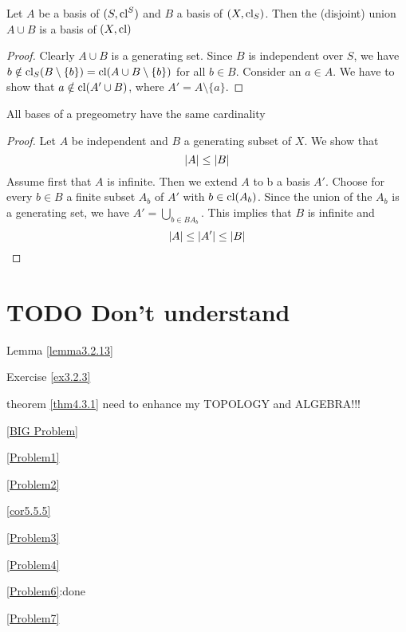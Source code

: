 \documentclass[11pt]{article}
\begin{document}
\begin{remark}
Let \(A\) be a basis of \((S,\operatorname{\text{cl}}^S)\) and \(B\) a basis of \((X,\operatorname{\text{cl}}_S)\). Then the (disjoint)
union \(A\cup B\) is a basis of \((X,\operatorname{\text{cl}})\)
\end{remark}

\begin{proof}
Clearly \(A\cup B\) is a generating set. Since \(B\) is independent over \(S\), we
have \(b\notin\operatorname{\text{cl}}_S(B\setminus\{b\})=\operatorname{\text{cl}}(A\cup B\setminus\{b\})\) for all \(b\in B\). Consider an \(a\in A\). We have to show
that \(a\notin\operatorname{\text{cl}}(A'\cup B)\), where \(A'=A\setminus\{a\}\).
\end{proof}

\begin{lemma}[]
All bases of a pregeometry have the same cardinality
\end{lemma}

\begin{proof}
Let \(A\) be independent and \(B\) a generating subset of \(X\). We show that
\begin{equation*}
\abs{A}\le\abs{B}
\end{equation*}
Assume first that \(A\) is infinite. Then we extend \(A\) to b a basis \(A'\). Choose for
every \(b\in B\) a finite subset \(A_b\) of \(A'\) with \(b\in\operatorname{\text{cl}}(A_b)\). Since the union of
the \(A_b\) is a generating set, we have \(A'=\bigcup_{b\in BA_b}\). This implies that \(B\) is infinite
and
\begin{equation*}
\abs{A}\le\abs{A'}\le\abs{B}
\end{equation*}
\end{proof}
\section{{\bfseries\sffamily TODO} Don't understand}
\label{sec:org63609ea}
Lemma \ref{lemma3.2.13}

Exercise \ref{ex3.2.3}

theorem \ref{thm4.3.1} need to enhance my TOPOLOGY and ALGEBRA!!!

\ref{BIG Problem}

\ref{Problem1}

\ref{Problem2}

\ref{cor5.5.5}

\ref{Problem3}

\ref{Problem4}



\ref{Problem6}:done

\ref{Problem7}
\end{document}
